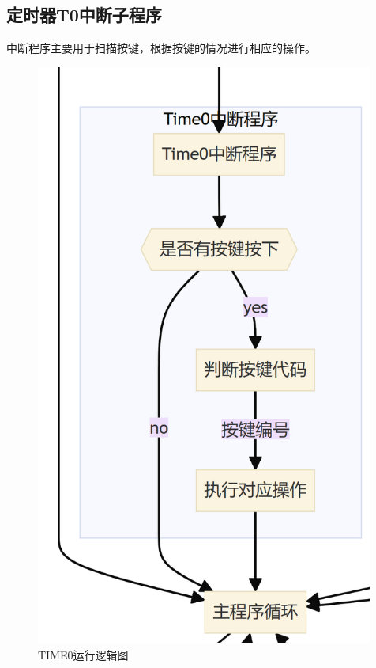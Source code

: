 \documentclass{article}
\begin{document}
\subsection{定时器T0中断子程序}
中断程序主要用于扫描按键，根据按键的情况进行相应的操作。
\begin{figure}[H]
\begin{minipage}{0.3\textwidth}
        \centering
        \includegraphics[width=0.99\textwidth]{assets/image-20240501181015810.png}
        \caption{TIME0运行逻辑图}
\end{minipage}
\begin{minipage}{0.667\textwidth}

\end{minipage}
\end{figure}
\end{document}
